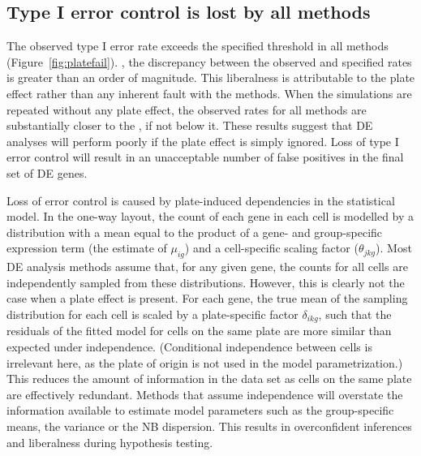 \documentclass[oupdraft]{bio}
\begin{document}

\subsection{Type I error control is lost by all methods}
The observed type I error rate exceeds the specified threshold in all methods (Figure~\ref{fig:platefail}).
, the discrepancy between the observed and specified rates is greater than an order of magnitude.
This liberalness is attributable to the plate effect rather than any inherent fault with the methods.
When the simulations are repeated without any plate effect, the observed rates for all methods are substantially closer to the , if not below it.
These results suggest that DE analyses will perform poorly if the plate effect is simply ignored.
Loss of type I error control will result in an unacceptable number of false positives in the final set of DE genes.

Loss of error control is caused by plate-induced dependencies in the statistical model.
In the one-way layout, the count of each gene in each cell is modelled by a distribution with a mean equal to the product of a gene- and group-specific expression term (the estimate of $\mu_{ig}$) and a cell-specific scaling factor ($\theta_{jkg}$).
Most DE analysis methods assume that, for any given gene, the counts for all cells are independently sampled from these distributions.
However, this is clearly not the case when a plate effect is present.
For each gene, the true mean of the sampling distribution for each cell is scaled by a plate-specific factor $\delta_{ikg}$, 
    such that the residuals of the fitted model for cells on the same plate are more similar than expected under independence.
(Conditional independence between cells is irrelevant here, as the plate of origin is not used in the model parametrization.)
This reduces the amount of information in the data set as cells on the same plate are effectively redundant.
Methods that assume independence will overstate the information available to estimate model parameters such as the group-specific means, the variance or the NB dispersion.
This results in overconfident inferences and liberalness during hypothesis testing.
\end{document}
